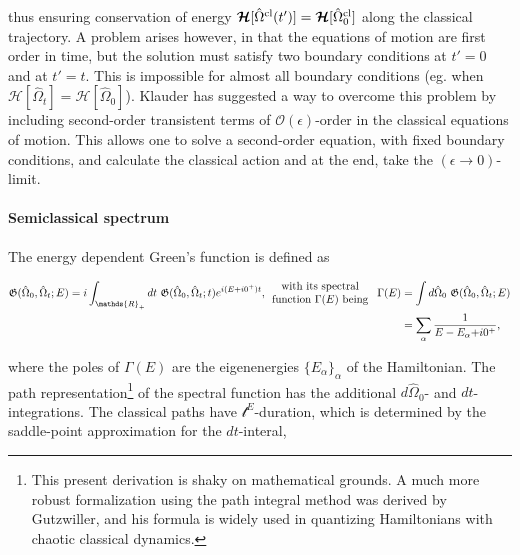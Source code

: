 thus ensuring conservation of energy $\bm{\mathcal{H}} [\hat{\Omega}^{\textnormal{cl}} (t')] = \bm{\mathcal{H}} [\hat{\Omega}^{\textnormal{cl}}_0]$ along the classical trajectory. A problem arises however, in that the equations of motion are first order in time, but the solution must satisfy two boundary conditions at $t' = 0$ and at $t' = t$. This is impossible for almost all boundary conditions (eg. when $\bm{\mathcal{H}} [\hat{\Omega}_{t}] = \bm{\mathcal{H}} [\hat{\Omega}_0]$). Klauder has suggested a way to overcome this problem by including second-order transistent terms of $\mathcal{O}(\epsilon)$-order in the classical equations of motion. This allows one to solve a second-order equation, with fixed boundary conditions, and calculate the classical action and at the end, take the $(\epsilon \rightarrow 0)$-limit. \bigbreak

\paragraph{Semiclassical spectrum}

The energy dependent Green's function is defined as 

\begin{equation*}\begin{split}
    \mathfrak{G}(\hat{\Omega}_0, \hat{\Omega}_t; E) = i \int_{\mathds{R}_+} dt \blanky \mathfrak{G}(\hat{\Omega}_0, \hat{\Omega}_t; t) e^{i(E+i0^+)t}, \begin{array}{cc}
         \textnormal{with its spectral } \\
         \textnormal{function $\Gamma(E)$ being } 
         \end{array}
        \Gamma(E) &= \int d\hat{\Omega}_0 \blanky \mathfrak{G}(\hat{\Omega}_0, \hat{\Omega}_t; E) \\
        &= \sum_{\alpha} \frac{1}{E-E_{\alpha}{ + i0^+}},
    \end{split}
\end{equation*}

where the poles of $\Gamma(E)$ are the eigenenergies $\{E_{\alpha}\}_{\alpha}$ of the Hamiltonian. The path  representation\footnote{This present derivation is shaky on mathematical grounds. A much more robust formalization using the path integral method was derived by Gutzwiller, and his formula is widely used in quantizing Hamiltonians with chaotic classical dynamics.} of the spectral function has the additional $d\hat{\Omega}_0$- and $dt$-integrations. The classical paths have $\mathcal{t}^E$-duration, which is determined by the saddle-point approximation for the $dt$-interal, 

